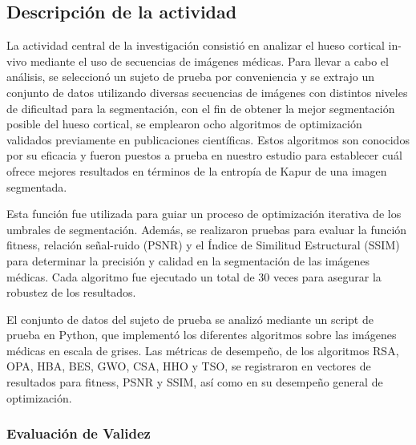 \documentclass[conference]{IEEEtran}
\begin{document}

\subsection{Descripción de la actividad}
\noindent La actividad central de la investigación consistió en analizar el hueso cortical in-vivo mediante el uso de secuencias de imágenes médicas. Para llevar a cabo el análisis, se seleccionó un sujeto de prueba por conveniencia y se extrajo un conjunto de datos utilizando diversas secuencias de imágenes con distintos niveles de dificultad para la segmentación, con el fin de obtener la mejor segmentación posible del hueso cortical, se emplearon ocho algoritmos de optimización validados previamente en publicaciones científicas. Estos algoritmos son conocidos por su eficacia y fueron puestos a prueba en nuestro estudio para establecer cuál ofrece mejores resultados en términos de la entropía de Kapur de una imagen segmentada.

\noindent Esta función fue utilizada para guiar un proceso de optimización iterativa de los umbrales de segmentación. Además, se realizaron pruebas para evaluar la función fitness, relación señal-ruido (PSNR) y el Índice de Similitud Estructural (SSIM) para determinar la precisión y calidad en la segmentación de las imágenes médicas. Cada algoritmo fue ejecutado un total de 30 veces para asegurar la robustez de los resultados.

\noindent El conjunto de datos del sujeto de prueba se analizó mediante un script de prueba en Python, que implementó los diferentes algoritmos sobre las imágenes médicas en escala de grises. Las métricas de desempeño, de los algoritmos RSA, OPA, HBA, BES, GWO, CSA, HHO y TSO, se registraron en vectores de resultados para fitness, PSNR y SSIM, así como en su desempeño general de optimización. 

\subsubsection{Evaluación de Validez}
\end{document}
